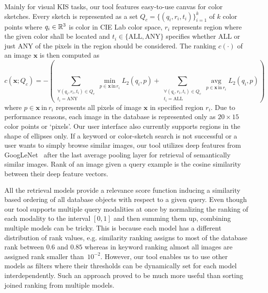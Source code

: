 Mainly for visual KIS tasks, our tool features easy-to-use canvas for color sketches. Every sketch is represented as a set $Q_c = \{\left(q_i, r_i, t_i\right)\}^k_{i=1}$ of $k$ color points where $q_i\in\mathbb{R}^3$ is color in CIE Lab color space, $r_i$ represents region where the given color shall be located and $t_i\in \{\mathrm{ALL},\mathrm{ANY}\}$ specifies whether ALL or just ANY of the pixels in the region should be considered. The ranking $c(\cdot)$ of an image $\bm{x}$ is then computed as
\begin{equation}
c\left(\bm{x}; Q_c\right) =-\left(\sum\limits_{\substack{\forall \left(q_i,r_i,t_i\right) \in Q_c\\t_i=\mathrm{ANY}}} \min\limits_{p\in\bm{x}\,\mathrm{in}\,r_i}L_2\left(q_i, p\right)+\sum\limits_{\substack{\forall \left(q_i,r_i,t_i\right) \in Q_c\\t_i=\mathrm{ALL}}} \mathop{\mathrm{avg}}\limits_{p\in\bm{x}\,\mathrm{in}\,r_i}L_2\left(q_i, p\right)\right)
\end{equation}
where $p\in\bm{x}\ \mathrm{in}\ r_i$ represents all pixels of image $\bm{x}$ in specified region $r_i$. Due to performance reasons, each image in the database is represented only as $20\times 15$ color points or `pixels'. Our user interface also currently supports regions in the shape of ellipses only. If a keyword or color-sketch search is not successful or a user wants to simply browse similar images, our tool utilizes deep features from GoogLeNet~\cite{szegedy2015going} after the last average pooling layer for retrieval of semantically similar images. Rank of an image given a query example is the cosine similarity between their deep feature vectors.


All the retrieval models provide a relevance score function inducing a similarity based ordering of all database objects with respect to a given query. Even though our tool supports multiple query modalities at once by normalizing the ranking of each modality to the interval $[0, 1]$ and then summing them up, combining multiple models can be tricky. This is because each model has a different distribution of rank values, e.g. similarity ranking assigns to most of the database rank between $0.6$ and $0.85$ whereas in keyword ranking almost all images are assigned rank smaller than~$10^{-2}$. However, our tool enables us to use other models as filters where their thresholds can be dynamically set for each model interdependently. Such an approach proved to be much more useful than sorting joined ranking from multiple models.

